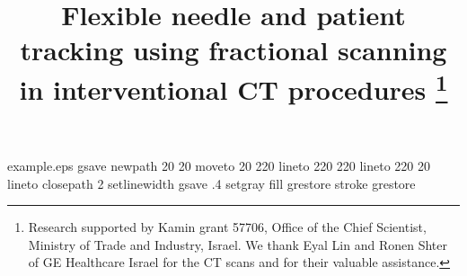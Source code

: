 %
%
%
%
%
\begin{filecontents*}{example.eps}
gsave
newpath
  20 20 moveto
  20 220 lineto
  220 220 lineto
  220 20 lineto
closepath
2 setlinewidth
gsave
  .4 setgray fill
grestore
stroke
grestore
\end{filecontents*}
%
\RequirePackage{fix-cm}
%
\documentclass{svjour3}                     %
%
\smartqed  %
%
\usepackage{graphicx}
\usepackage{enumitem}
\usepackage{float}
\usepackage{subfig}
\usepackage{cite}
\usepackage{url}
\usepackage{spreadtab}
\usepackage{algorithm,algorithmic}
\usepackage{amsmath}
\usepackage[numbers]{natbib}
\usepackage{xcolor}

\DeclareMathOperator*{\argmin}{argmin} %
\DeclareMathOperator*{\myint}{int} %
%
%
%
%
%
\journalname{}


\title{Flexible needle and patient tracking using fractional scanning in interventional CT procedures
\thanks{Research supported by Kamin grant 57706, Office of the Chief Scientist, Ministry of Trade and Industry, Israel. We thank Eyal Lin and Ronen Shter of GE Healthcare Israel for the CT scans and for their valuable assistance.}%
}


